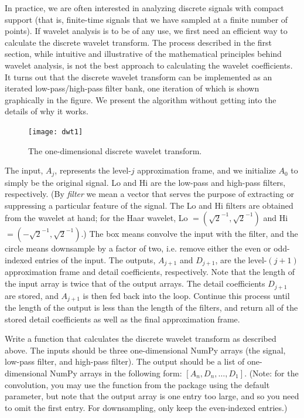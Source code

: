 In practice, we are often interested in analyzing discrete signals with compact support (that is,
finite-time signals that we have sampled at a finite number of points). If wavelet analysis is
to be of any use, we first need an efficient way to calculate the discrete wavelet transform.
The process described in the first section, while intuitive and illustrative of the mathematical
principles
behind wavelet analysis, is not the best approach to calculating the wavelet coefficients. It
turns out that the discrete wavelet transform can be implemented as an iterated low-pass/high-pass
filter bank, one iteration of which is shown graphically in the figure. We present the
algorithm without getting into the details of why it works.
\begin{figure}[H]
\centering
\texttt{[image: dwt1]}
\caption{The one-dimensional discrete wavelet transform.}
\end{figure}
The input, $A_j$, represents the level-$j$ approximation frame, and we initialize $A_0$ to
simply be the original signal. Lo and Hi are the low-pass and high-pass filters, respectively.
(By \emph{filter} we mean a vector that serves the purpose of extracting or suppressing a
particular feature of the signal. The Lo and Hi filters are obtained from the wavelet at hand;
for the Haar wavelet, Lo $= (\sqrt{2}^{-1}, \sqrt{2}^{-1})$ and Hi $= (-\sqrt{2}^{-1}, \sqrt{2}
^{-1})$.) The box means convolve the input with the filter, and the circle means downsample by
a factor of two, i.e. remove either the even or odd-indexed entries of the input. The outputs,
$A_{j+1}$ and $D_{j+1}$, are the level-$(j+1)$ approximation frame and detail coefficients,
respectively. Note that the length of the input array is twice that of the output arrays. The
detail coefficients $D_{j+1}$ are stored, and $A_{j+1}$ is then fed back into the loop. Continue
this process until the length of the output is less than the length of the filters, and
return all of the stored detail coefficients as well as the final approximation frame.
\begin{problem}
Write a function that calculates the discrete wavelet transform as described above.
The inputs should be three one-dimensional NumPy arrays (the signal, low-pass filter, and
high-pass filter). The output should be a list of one-dimensional NumPy arrays in the
following form: $[A_n, D_n, \ldots, D_1]$. (Note: for the convolution, you may use
the  function from the  package using the default
 parameter, but note that the output array is one entry too large, and so
you need to omit the first entry. For downsampling, only keep the even-indexed entries.)
\end{problem}

